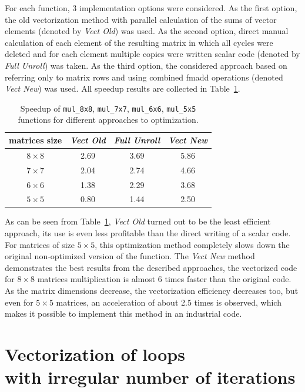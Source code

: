 \documentclass[
11pt,%
tightenlines,%
twoside,%
onecolumn,%
nofloats,%
nobibnotes,%
nofootinbib,%
superscriptaddress,%
noshowpacs,%
centertags]%
{revtex4}
\begin{document}
For each function, 3 implementation options were considered.
As the first option, the old vectorization method with parallel calculation of the sums of vector elements (denoted by \textit{Vect Old}) was used.
As the second option, direct manual calculation of each element of the resulting matrix in which all cycles were deleted and for each element multiple copies were written scalar code (denoted by \textit{Full Unroll}) was taken.
As the third option, the considered approach based on referring only to matrix rows and using combined fmadd operations (denoted \textit{Vect New}) was used.
All speedup results are collected in Table~\ref{tab:mul_speedup}.

\begin{table}[!h]
\setcaptionmargin{0mm}
\onelinecaptionsfalse
{}
\caption{Speedup of \texttt{mul\_8x8}, \texttt{mul\_7x7}, \texttt{mul\_6x6}, \texttt{mul\_5x5} functions for different approaches to optimization.}
\bigskip
\begin{tabular}{|c|c|c|c|}
\hline
matrices size & \textit{Vect Old} & \textit{Full Unroll} & \textit{Vect New} \\
\hline
$8 \times 8$ & 2.69 & 3.69 & 5.86 \\
$7 \times 7$ & 2.04 & 2.74 & 4.66 \\
$6 \times 6$ & 1.38 & 2.29 & 3.68 \\
$5 \times 5$ & 0.80 & 1.44 & 2.50 \\
\hline
\end{tabular}
\label{tab:mul_speedup}
\end{table}

As can be seen from Table~\ref{tab:mul_speedup}, \textit{Vect Old} turned out to be the least efficient approach, its use is even less profitable than the direct writing of a scalar code.
For matrices of size $5 \times 5$, this optimization method completely slows down the original non-optimized version of the function.
The \textit{Vect New} method demonstrates the best results from the described approaches, the vectorized code for $8 \times 8$ matrices multiplication is almost 6 times faster than the original code.
As the matrix dimensions decrease, the vectorization efficiency decreases too, but even for $5 \times 5$ matrices, an acceleration of about 2.5 times is observed, which makes it possible to implement this method in an industrial code.

\section{Vectorization of loops \protect\\
with irregular number of iterations}
\end{document}
